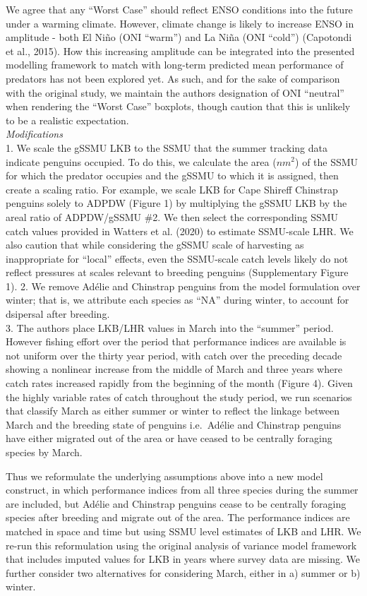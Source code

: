 \documentclass[]{elsarticle} %
\begin{document}
We agree that any ``Worst Case'' should reflect ENSO conditions into the
future under a warming climate. However, climate change is likely to
increase ENSO in amplitude - both El Niño (ONI ``warm'') and La Niña
(ONI ``cold'') (Capotondi et al., 2015). How this increasing amplitude
can be integrated into the presented modelling framework to match with
long-term predicted mean performance of predators has not been explored
yet. As such, and for the sake of comparison with the original study, we
maintain the authors designation of ONI ``neutral'' when rendering the
``Worst Case'' boxplots, though caution that this is unlikely to be a
realistic expectation.\\
\newline \emph{Modifications}\\
1. We scale the gSSMU LKB to the SSMU that the summer tracking data
indicate penguins occupied. To do this, we calculate the area (\(nm^2\))
of the SSMU for which the predator occupies and the gSSMU to which it is
assigned, then create a scaling ratio. For example, we scale LKB for
Cape Shireff Chinstrap penguins solely to ADPDW (Figure 1) by
multiplying the gSSMU LKB by the areal ratio of ADPDW/gSSMU \#2. We then
select the corresponding SSMU catch values provided in Watters et al.
(2020) to estimate SSMU-scale LHR. We also caution that while
considering the gSSMU scale of harvesting as inappropriate for ``local''
effects, even the SSMU-scale catch levels likely do not reflect
pressures at scales relevant to breeding penguins (Supplementary Figure
1). 2. We remove Adélie and Chinstrap penguins from the model
formulation over winter; that is, we attribute each species as ``NA''
during winter, to account for dsipersal after breeding.\\
3. The authors place LKB/LHR values in March into the ``summer'' period.
However fishing effort over the period that performance indices are
available is not uniform over the thirty year period, with catch over
the preceding decade showing a nonlinear increase from the middle of
March and three years where catch rates increased rapidly from the
beginning of the month (Figure 4). Given the highly variable rates of
catch throughout the study period, we run scenarios that classify March
as either summer or winter to reflect the linkage between March and the
breeding state of penguins i.e.~Adélie and Chinstrap penguins have
either migrated out of the area or have ceased to be centrally foraging
species by March.

Thus we reformulate the underlying assumptions above into a new model
construct, in which performance indices from all three species during
the summer are included, but Adélie and Chinstrap penguins cease to be
centrally foraging species after breeding and migrate out of the area.
The performance indices are matched in space and time but using SSMU
level estimates of LKB and LHR. We re-run this reformulation using the
original analysis of variance model framework that includes imputed
values for LKB in years where survey data are missing. We further
consider two alternatives for considering March, either in a) summer or
b) winter.
\end{document}
